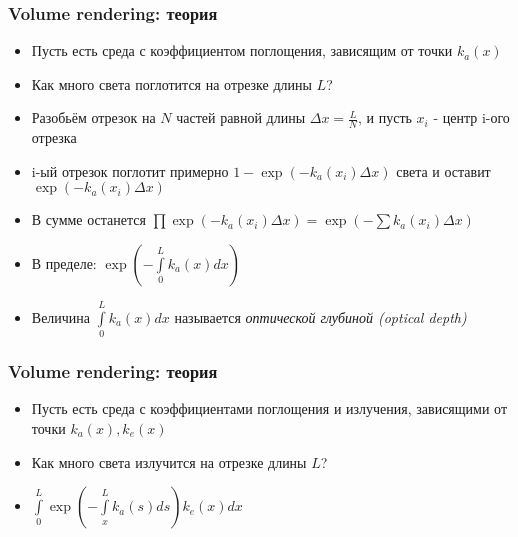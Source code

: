 \documentclass{beamer}
\begin{document}
\begin{frame}[fragile]
\frametitle{Volume rendering: теория}
\begin{itemize}
\item Пусть есть среда с коэффициентом поглощения, зависящим от точки \begin{math}k_a(x)\end{math}
\pause
\item Как много света поглотится на отрезке длины \begin{math}L\end{math}?
\pause
\item Разобьём отрезок на \begin{math}N\end{math} частей равной длины \begin{math}\Delta x = \frac{L}{N}\end{math}, и пусть \begin{math}x_i\end{math} - центр i-ого отрезка
\pause
\item i-ый отрезок поглотит примерно \begin{math}1 - \exp\left(-k_a(x_i) \Delta x\right)\end{math} света и оставит \begin{math}\exp\left(-k_a(x_i) \Delta x\right)\end{math}
\pause
\item В сумме останется \begin{math}\prod\exp\left(-k_a(x_i) \Delta x\right) = \exp\left(-\sum k_a(x_i) \Delta x\right)\end{math}
\pause
\item В пределе: \begin{math}\exp\left(-\int\limits_0^L k_a(x) dx\right)\end{math}
\pause
\item Величина \begin{math}\int\limits_0^L k_a(x) dx\end{math} называется \textit{оптической глубиной (optical depth)}
\end{itemize}
\end{frame}

\begin{frame}[fragile]
\frametitle{Volume rendering: теория}
\begin{itemize}
\item Пусть есть среда с коэффициентами поглощения и излучения, зависящими от точки \begin{math}k_a(x), k_e(x)\end{math}
\pause
\item Как много света излучится на отрезке длины \begin{math}L\end{math}?
\pause
\item \begin{math}\int\limits_0^L \exp\left(-\int\limits_x^L k_a(s) ds\right) k_e(x) dx\end{math}
\end{itemize}
\end{frame}
\end{document}
